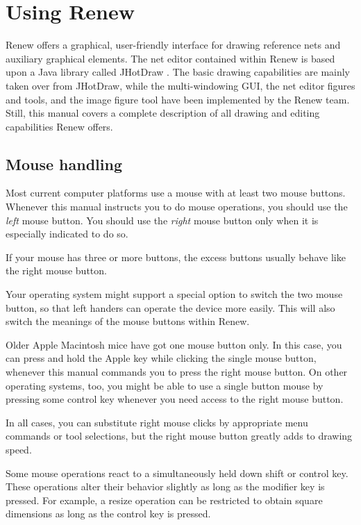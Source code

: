 

\chapter{Using Renew}
\label{ch:usage}

Renew offers a graphical, user-friendly interface for
drawing reference nets and auxiliary graphical elements.
The net editor contained within Renew is based upon a Java library
called JHotDraw \cite{Gamma98}.
The basic drawing capabilities are mainly taken over from JHotDraw,
while the multi-windowing
GUI, the net editor figures and tools, and the image figure tool
have been implemented by the Renew team.
Still, this manual covers a complete description of all drawing
and editing capabilities Renew offers.


\section{Mouse handling}

Most current computer platforms use a mouse with at least two mouse
buttons. Whenever this manual instructs you to do mouse operations,
you should use the \emph{left} mouse button. You should use the
\emph{right} mouse button only when it is especially indicated
to do so.

If your mouse has three or more buttons, the excess buttons
usually behave like the right mouse button.

Your operating system might support a special option
to switch the two mouse button, so that left handers
can operate the device more easily. This will also
switch the meanings of the mouse buttons within Renew.

Older Apple Macintosh mice have got one mouse button only.
In this case, you can press and hold the Apple key
while clicking the single mouse button, whenever
this manual commands you to press the right mouse button.
On other operating systems, too, you might be able to use
a single button mouse by pressing some control key
whenever you need access to the right mouse button.

In all cases, you can substitute right mouse clicks
by appropriate menu commands or tool selections,
but the right mouse button greatly adds to
drawing speed.

Some mouse operations react to a simultaneously held down shift or control
key.
These operations alter their behavior slightly as long as the modifier key
is pressed.
For example, a resize operation can be restricted to obtain square
dimensions as long as the control key is pressed.

